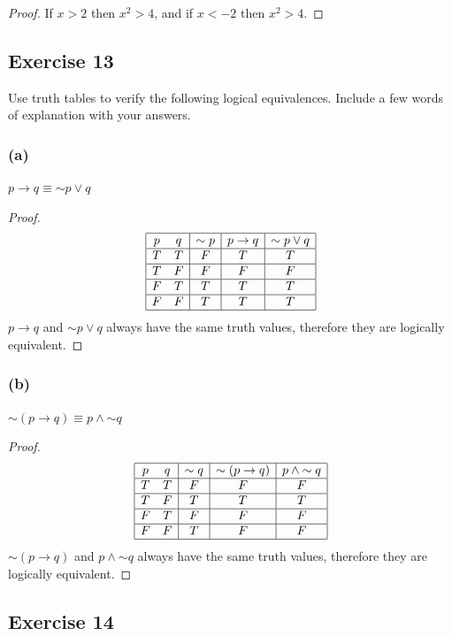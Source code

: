 \documentclass[14pt]{extarticle}
\begin{document}
\begin{proof}
If $x > 2$ then $x^2 > 4$, and if $x < -2$ then $x^2 > 4$.
\end{proof}

\subsection{Exercise 13}
Use truth tables to verify the following logical equivalences. Include a few words of explanation with your answers.

\subsubsection{(a)}
$p \to q \equiv {\sim p} \vee q$

\begin{proof}
$$
\begin{array}{|cc|c|c|c|}
\hline
p & q & {\sim p} & p \to q & {\sim p} \vee q \\
\hline
T & T & F & T & T \\
\hline
T & F & F & F & F \\
\hline
F & T & T & T & T \\
\hline
F & F & T & T & T \\
\hline
\end{array}
$$
$p \to q$ and ${\sim p} \vee q$ always have the same truth values, therefore they are logically equivalent.
\end{proof}

\subsubsection{(b)}
${\sim (p \to q)} \equiv p \wedge {\sim q}$

\begin{proof}
$$
\begin{array}{|cc|c|c|c|}
\hline
p & q & {\sim q} & {\sim (p \to q)} & p \wedge {\sim q} \\ \hline
T & T & F & F & F \\
\hline
T & F & T & T & T \\
\hline
F & T & F & F & F \\
\hline
F & F & T & F & F \\
\hline
\end{array}
$$
${\sim (p \to q)}$ and $p \wedge {\sim q}$ always have the same truth values, therefore they are logically equivalent. \end{proof}

\subsection{Exercise 14}
\end{document}
